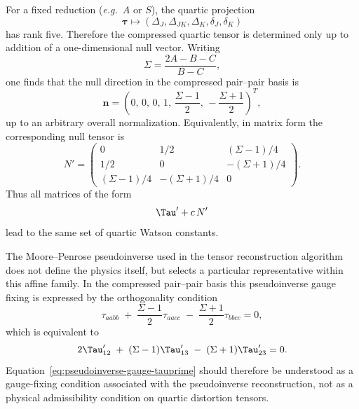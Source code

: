 For a fixed reduction (\emph{e.g.}\ $A$ or $S$), the quartic projection
\begin{equation}
\boldsymbol{\tau} \longmapsto
(\Delta_J,\Delta_{JK},\Delta_K,\delta_J,\delta_K)
\end{equation}
has rank five.  Therefore the compressed quartic tensor is determined only up
to addition of a one-dimensional null vector.  Writing
\begin{equation}
\Sigma=\frac{2A-B-C}{B-C},
\end{equation}
one finds that the null direction in the compressed pair--pair basis is
\begin{equation}
\mathbf{n}=
\left(
0,\,
0,\,
0,\,
1,\,
\frac{\Sigma-1}{2},\,
-\frac{\Sigma+1}{2}
\right)^T,
\label{eq:null-vector}
\end{equation}
up to an arbitrary overall normalization.  Equivalently, in matrix form the
corresponding null tensor is
\begin{equation}
N'=
\begin{pmatrix}
0 & 1/2 & (\Sigma-1)/4 \\
1/2 & 0 & -(\Sigma+1)/4 \\
(\Sigma-1)/4 & -(\Sigma+1)/4 & 0
\end{pmatrix}.
\label{eq:null-matrix}
\end{equation}
Thus all matrices of the form
\begin{equation}
\Tau' + c\,N'
\end{equation}
lead to the same set of quartic Watson constants.

The Moore--Penrose pseudoinverse used in the tensor reconstruction algorithm
does not define the physics itself, but selects a particular representative
within this affine family.  In the compressed pair--pair basis this
pseudoinverse gauge fixing is expressed by the orthogonality condition
\begin{equation}
\tau_{aabb}
\;+\;
\frac{\Sigma-1}{2}\tau_{aacc}
\;-\;
\frac{\Sigma+1}{2}\tau_{bbcc}
=0,
\label{eq:pseudoinverse-gauge-tau}
\end{equation}
which is equivalent to
\begin{equation}
2\Tau'_{12}
\;+\;
(\Sigma-1)\Tau'_{13}
\;-\;
(\Sigma+1)\Tau'_{23}
=0.
\label{eq:pseudoinverse-gauge-tauprime}
\end{equation}
Equation~\eqref{eq:pseudoinverse-gauge-tauprime} should therefore be understood
as a gauge-fixing condition associated with the pseudoinverse reconstruction,
not as a physical admissibility condition on quartic distortion tensors.

